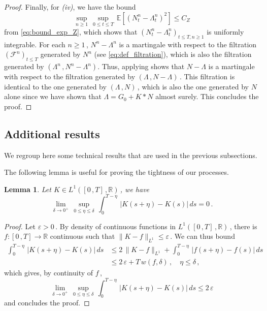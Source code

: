 \documentclass{article}
\newcommand{\1}{\mathbbm{1}}
\newtheorem{lemma}[theorem]{Lemma}
\numberwithin{equation}{section}
\begin{document}
\begin{proof}
    Finally, for \textit{(iv)}, we have the bound 
    $$
    \sup_{n \geq 1}\, \sup_{0 \leq t \leq T}\, \mathbb E \left[\left(N^n_t - \Lambda^n_t\right)^2 \right] \leq C_Z
    $$
    from \eqref{eq:bound_exp_Z}, which shows that $\left(N^n_t - \Lambda^n_t\right)_{t \leq T, n \geq 1}$ is uniformly integrable. For each $n \geq 1\,$, $N^n - \Lambda^n$ is a martingale with respect to the filtration $\left(\mathcal F^n\right)_{t \leq T}$ generated by $N^n$ (see \eqref{eq:def_filtration}), which is also the filtration generated by $\left(\Lambda^n\,, N^n - \Lambda^n\right)$. Thus, applying \citet[Theorem~5.3]{whitt2007proofs} shows that $N- \Lambda$ is a martingale with respect to the filtration generated by $\left(\Lambda\,, N - \Lambda\right)\,$. This filtration is identical to the one generated by $\left(\Lambda\,, N\right)\,$, which is also the one generated by $N$ alone since we have shown that $\Lambda = G_0 + K * N$ almost surely. This concludes the proof.
\end{proof}



\subsection{Additional results}
We regroup here some technical results that are used in the previous subsections.

The following lemma is useful for proving the tightness of our processes.
\begin{lemma} \label{lemma:translation_continuous_L1}
Let $K \in L^1\left([0\,,T]\,, \mathbb R\right)\,$, we have 
$$
\lim_{\delta \to 0^+}\, \sup_{0 \leq \eta \leq \delta}\, \int_0^{T-\eta}\, \left|K(s + \eta) - K(s)\right|\,ds = 0\,.
$$
\end{lemma}
\begin{proof}
    Let $\varepsilon > 0\,.$ By density of continuous functions in $L^1\left([0\,,T]\,, \mathbb R\right)\,$, there is $f : [0\,,T] \to \mathbb R$ continuous such that $\|K - f\|_{L^1} \leq \varepsilon\,$. We can thus bound
    \begin{align*}
        \int_0^{T- \eta}\, \left|K(s + \eta) - K(s)\right|\, ds &\leq 2\,\|K-f\|_{L^1} + \int_0^{T-\eta}\, \left|f(s + \eta) - f(s)\right|\,ds \\
        &\leq 2\,\varepsilon + T\,w(f, \delta)\,, \quad \eta \leq \delta\,,
    \end{align*}
    which gives, by continuity of $f\,$,
    $$
    \lim_{\delta \to 0^+}\, \sup_{0 \leq \eta \leq \delta}\, \int_0^{T-\eta}\, \left|K(s + \eta) - K(s) \right|\, ds \leq 2 \, \varepsilon
    $$
    and concludes the proof.
\end{proof}
\end{document}
